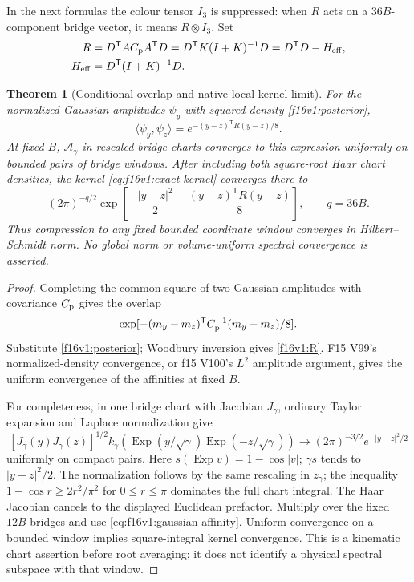 \documentclass[11pt,oneside]{article}
\newtheorem{theorem}{Theorem}[section]
\begin{document}
In the next formulas the colour tensor \(I_3\) is suppressed:
when \(R\) acts on a \(36B\)-component bridge vector, it means
\(R\otimes I_3\).
Set
\begin{align}
 R&=D^{\mathsf T}A C_{\rm p}A^{\mathsf T}D
    =D^{\mathsf T}K(I+K)^{-1}D
    =D^{\mathsf T}D-H_{\rm eff},\notag\\
 H_{\rm eff}&=D^{\mathsf T}(I+K)^{-1}D .
 \label{f16v1:R}
\end{align}

\begin{theorem}[Conditional overlap and native local-kernel limit]
\label{f16v1:gaussian-affinity}
For the normalized Gaussian amplitudes \(\psi_y\) with squared
density \eqref{f16v1:posterior},
\begin{equation}
 \langle\psi_y,\psi_z\rangle
             =e^{-(y-z)^{\mathsf T}R(y-z)/8}.
 \label{eq:f16v1:gaussian-affinity}
\end{equation}
At fixed \(B\), \(\mathcal A_\gamma\) in rescaled bridge charts
converges to this expression uniformly on bounded pairs of
bridge windows. After including both square-root Haar chart
densities, the kernel \eqref{eq:f16v1:exact-kernel} converges there to
\begin{equation}
 (2\pi)^{-q/2}
   \exp\left[-\frac{|y-z|^2}{2}
                    -\frac{(y-z)^{\mathsf T}R(y-z)}8\right],
       \qquad q=36B.
 \label{f16v1:native-leading-kernel}
\end{equation}
Thus compression to any fixed bounded coordinate window
converges in Hilbert--Schmidt norm. No global norm or
volume-uniform spectral convergence is asserted.
\end{theorem}

\begin{proof}
Completing the common square of two Gaussian amplitudes with
covariance \(C_{\rm p}\) gives the overlap
\[
       \exp[-(m_y-m_z)^{\mathsf T}C_{\rm p}^{-1}(m_y-m_z)/8].
\]
Substitute \eqref{f16v1:posterior}; Woodbury inversion gives
\eqref{f16v1:R}. F15 V99's normalized-density convergence,
or f15 V100's \(L^2\) amplitude argument, gives the uniform
convergence of the affinities at fixed \(B\).

For completeness, in one bridge chart with Jacobian \(J_\gamma\),
ordinary Taylor expansion and Laplace normalization give
\[
 [J_\gamma(y)J_\gamma(z)]^{1/2}
 k_\gamma(\operatorname{Exp}(y/\sqrt\gamma)
                      \operatorname{Exp}(-z/\sqrt\gamma))
       \longrightarrow(2\pi)^{-3/2}e^{-|y-z|^2/2}
\]
uniformly on compact pairs. Here
\(s(\operatorname{Exp}v)=1-\cos|v|\);
\(\gamma s\) tends to \(|y-z|^2/2\).
The normalization follows by the same rescaling in
\(z_\gamma\); the inequality \(1-\cos r\ge2r^2/\pi^2\)
for \(0\le r\le\pi\) dominates the full chart integral.
The Haar Jacobian cancels to the displayed Euclidean prefactor.
Multiply over the fixed \(12B\) bridges and use
\eqref{eq:f16v1:gaussian-affinity}. Uniform convergence on
a bounded window implies square-integral kernel convergence.
This is a kinematic chart assertion before root averaging;
it does not identify a physical spectral subspace with that window.
\end{proof}
\end{document}
